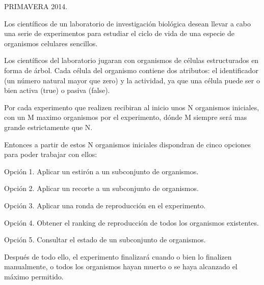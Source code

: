 P\-R\-I\-M\-A\-V\-E\-R\-A 2014.

Los científicos de un laboratorio de investigación biológica desean llevar a cabo una serie de experimentos para estudiar el ciclo de vida de una especie de organismos celulares sencillos.

Los científicos del laboratorio jugaran con organismos de células estructurados en forma de árbol. Cada célula del organismo contiene dos atributos\-: el identificador (un número natural mayor que zero) y la actividad, ya que una célula puede ser o bien activa (true) o pasiva (false).

Por cada experimento que realizen recibiran al inicio unos N organismos iniciales, con un M maximo organismos por el experimento, dónde M siempre será mas grande estrictamente que N.

Entonces a partir de estos N organismos iniciales dispondran de cinco opciones para poder trabajar con ellos\-:

Opción 1. Aplicar un estirón a un subconjunto de organismos.

Opción 2. Aplicar un recorte a un subconjunto de organismos.

Opción 3. Aplicar una ronda de reproducción en el experimento.

Opción 4. Obtener el ranking de reproducción de todos los organismos existentes.

Opción 5. Consultar el estado de un subconjunto de organismos.

Después de todo ello, el experimento finalizará cuando o bien lo finalizen manualmente, o todos los organismos hayan muerto o se haya alcanzado el máximo permitido. 